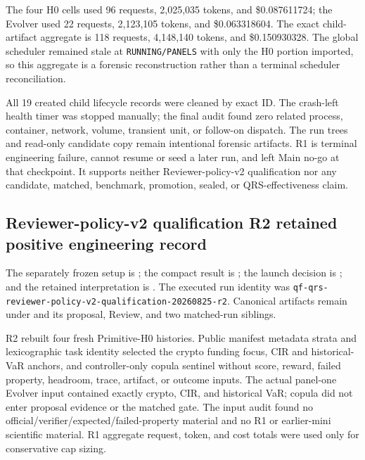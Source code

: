 The four H0 cells used 96 requests, 2,025,035 tokens, and \$0.087611724; the
Evolver used 22 requests, 2,123,105 tokens, and \$0.063318604. The exact child-
artifact aggregate is 118 requests, 4,148,140 tokens, and \$0.150930328. The
global scheduler remained stale at \texttt{RUNNING/PANELS} with only the H0
portion imported, so this aggregate is a forensic reconstruction rather than
a terminal scheduler reconciliation.

All 19 created child lifecycle records were cleaned by exact ID. The crash-left
health timer was stopped manually; the final audit found zero related process,
container, network, volume, transient unit, or follow-on dispatch. The run
trees and read-only candidate copy remain intentional forensic artifacts. R1
is terminal engineering failure, cannot resume or seed a later run, and left
Main no-go at that checkpoint. It supports neither Reviewer-policy-v2
qualification nor any candidate, matched, benchmark, promotion, sealed, or
QRS-effectiveness claim.

\subsection{Reviewer-policy-v2 qualification R2 retained positive engineering record}

The separately frozen setup is
; the
compact result is
;
the launch decision is
;
and the retained interpretation is
.
The executed run identity was
\texttt{qf-qrs-reviewer-policy-v2-qualification-20260825-r2}. Canonical
artifacts remain under
and its proposal, Review, and two matched-run siblings.

R2 rebuilt four fresh Primitive-H0 histories. Public manifest metadata strata
and lexicographic task identity selected the crypto funding focus, CIR and
historical-VaR anchors, and controller-only copula sentinel without score,
reward, failed property, headroom, trace, artifact, or outcome inputs. The
actual panel-one Evolver input contained exactly crypto, CIR, and historical
VaR; copula did not enter proposal evidence or the matched gate. The input audit
found no official/verifier/expected/failed-property material and no R1 or
earlier-mini scientific material. R1 aggregate request, token, and cost totals
were used only for conservative cap sizing.

